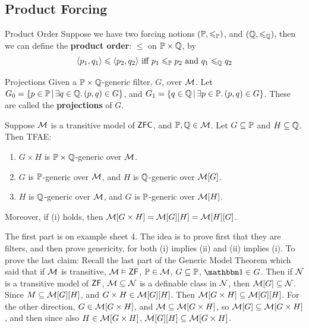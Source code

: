 \documentclass{article}
\begin{document}
    \subsection{Product Forcing}
    \begin{fancydefine}{Product Order}
        Suppose we have two forcing notions $(\mathbb{P}, \leqslant_{\mathbb{P}})$, and $(\mathbb{Q}, \leqslant_{\mathbb{Q}})$, then we can define the \textbf{product order}: $\leq$ on $\mathbb{P} \times \mathbb{Q}$, by \[ \langle p_{1}, q_{1} \rangle \leqslant \langle p_{2}, q_{2} \rangle \text{ iff } p_{1} \leqslant_{\mathbb{P}} p_{2} \text{ and } q_{1} \leqslant_{\mathbb{Q}} q_{2}\]
    \end{fancydefine}
    \begin{fancydefine}{Projections}
        Given a $\mathbb{P} \times \mathbb{Q}$-generic filter, $G$, over $\mathcal{M}$. Let $G_{0} = \{ p \in \mathbb{P} \, | \, \exists q \in \mathbb{Q}. \, (p,q) \in G \}$, and $G_{1} = \{q \in \mathbb{Q} \, | \, \exists p \in \mathbb{P}. \, (p,q) \in G \}$. These are called the \textbf{projections} of $G$.
    \end{fancydefine}
    \begin{fancylem}{}
        Suppose $\mathcal{M}$ is a transitive model of $\mathsf{ZFC}$, and $\mathbb{P}, \mathbb{Q} \in \mathcal{M}$. Let $G \subseteq \mathbb{P}$ and $H \subseteq \mathbb{Q}$. Then TFAE: \begin{enumerate}
            \item $G \times H$ is $\mathbb{P} \times \mathbb{Q}$-generic over $\mathcal{M}$.
            \item $G$ is $\mathbb{P}$-generic over $\mathcal{M}$, and $H$ is $\mathbb{Q}$-generic over $\mathcal{M}[G]$.
            \item $H$ is $\mathbb{Q}$-generic over $\mathcal{M}$, and $G$ is $\mathbb{P}$-generic over $\mathcal{M}[H]$.
        \end{enumerate}
        Moreover, if (i) holds, then $\mathcal{M}[G \times H] = \mathcal{M}[G][H] = \mathcal{M}[H][G]$.
    \end{fancylem}
    \proof The first part is on example sheet 4. The idea is to prove first that they are filters, and then prove genericity, for both (i) implies (ii) and (ii) implies (i). To prove the last claim: \gap
    Recall the last part of the Generic Model Theorem which said that if $\mathcal{M}$ is transitive, $\mathcal{M} \vDash \mathsf{ZF}$, $\mathbb{P} \in \mathcal{M}$, $G \subseteq \mathbb{P}$, $\bbone \in G$. Then if $\mathcal{N}$ is a transitive model of $\mathsf{ZF}$, $\mathcal{M} \subseteq \mathcal{N}$ is a definable class in $\mathcal{N}$, then $\mathcal{M}[G] \subseteq \mathcal{N}$. \gap
    Since $M \subseteq \mathcal{M}[G][H]$, and $G \times H \in \mathcal{M}[G][H]$. Then $\mathcal{M}[G \times H] \subseteq \mathcal{M}[G][H]$.\gap
    For the other direction, $G \in \mathcal{M}[G \times H]$, and $\mathcal{M} \subseteq \mathcal{M}[G \times H]$, so $\mathcal{M}[G] \subseteq \mathcal{M}[G \times H]$, and then since also $H \in \mathcal{M}[G \times H]$, $\mathcal{M}[G][H] \subseteq \mathcal{M}[G \times H]$.
    \endproof
\end{document}

